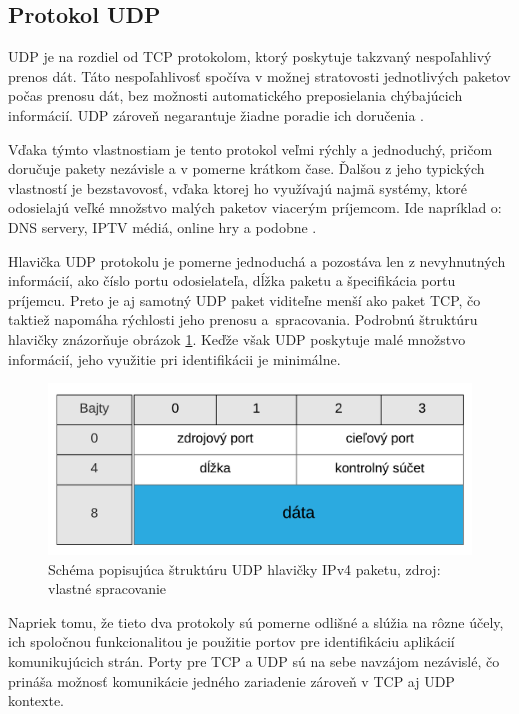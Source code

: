\documentclass[
  printed, %
  table,   %
  lof,     %
  nolot,   %
  nocover
]{fithesis3}
\begin{document}
\subsection{Protokol UDP}
UDP je na rozdiel od TCP protokolom, ktorý poskytuje takzvaný nespoľahlivý
prenos dát. Táto nespoľahlivosť spočíva v možnej stratovosti jednotlivých
paketov počas prenosu dát, bez možnosti automatického preposielania chýbajúcich
informácií. UDP zároveň negarantuje žiadne poradie ich doručenia \cite{rfc1122}.

Vďaka týmto
vlastnostiam je tento protokol veľmi rýchly a jednoduchý, pričom doručuje
pakety nezávisle a v pomerne krátkom čase. Ďalšou z jeho typických vlastností
je bezstavovosť, vďaka ktorej ho využívajú najmä systémy, ktoré odosielajú
veľké množstvo malých paketov viacerým príjemcom. Ide napríklad o: DNS servery,
IPTV médiá, online hry a podobne \cite{FIDIS:TCP}.

Hlavička UDP protokolu je pomerne jednoduchá a pozostáva len z nevyhnutných
informácií, ako číslo portu odosielateľa, dĺžka paketu a špecifikácia portu
príjemcu. Preto je aj samotný UDP paket viditeľne menší ako paket TCP, čo
taktiež napomáha rýchlosti jeho prenosu a~spracovania. Podrobnú štruktúru hlavičky
znázorňuje obrázok \ref{fig:net-udp-head}. Keďže však UDP poskytuje
malé množstvo informácií, jeho využitie pri identifikácii je minimálne.

\begin{figure}[t]
  \centering
    \includegraphics[width=.80\textwidth]{images/net-udp-head.png}
  \caption{Schéma popisujúca štruktúru UDP hlavičky IPv4 paketu, zdroj: vlastné spracovanie}
  \label{fig:net-udp-head}
\end{figure}

Napriek tomu, že tieto dva protokoly sú pomerne odlišné a slúžia na rôzne
účely, ich spoločnou funkcionalitou je použitie portov pre identifikáciu
aplikácií komunikujúcich strán. Porty pre TCP a UDP sú na sebe navzájom
nezávislé, čo prináša možnosť komunikácie jedného zariadenie zároveň v TCP aj
UDP kontexte.
\end{document}
